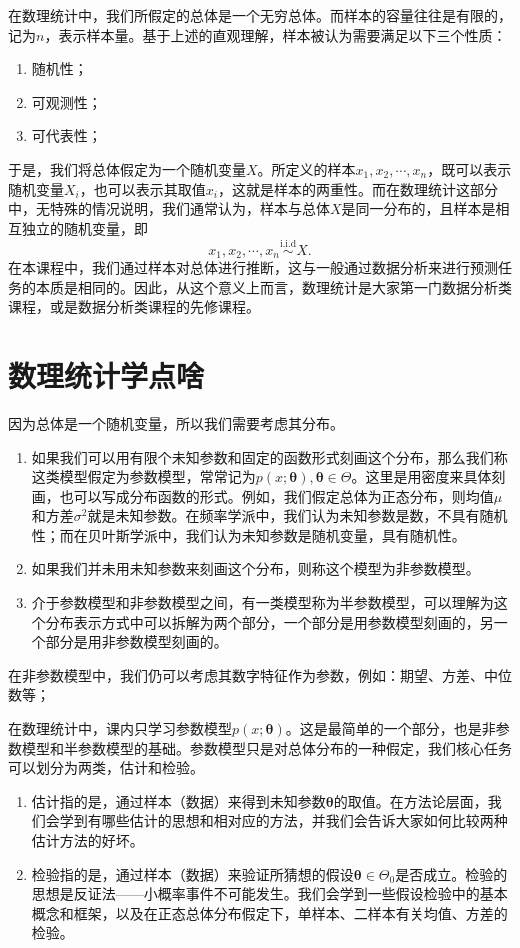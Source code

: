 在数理统计中，我们所假定的总体是一个无穷总体。而样本的容量往往是有限的，记为$n$，表示样本量。基于上述的直观理解，样本被认为需要满足以下三个性质：
\begin{enumerate}
    \item 随机性；
    \item 可观测性；
    \item 可代表性；
\end{enumerate}
于是，我们将总体假定为一个随机变量$X$。所定义的样本$x_1,x_2,\cdots,x_n$，既可以表示随机变量$X_i$，也可以表示其取值$x_i$，这就是样本的两重性。而在数理统计这部分中，无特殊的情况说明，我们通常认为，样本与总体$X$是同一分布的，且样本是相互独立的随机变量，即
$$
x_1,x_2,\cdots,x_n\overset{\text{i.i.d}}{\sim} X.
$$
在本课程中，我们通过样本对总体进行推断，这与一般通过数据分析来进行预测任务的本质是相同的。因此，从这个意义上而言，数理统计是大家第一门数据分析类课程，或是数据分析类课程的先修课程。

\section{数理统计学点啥}
因为总体是一个随机变量，所以我们需要考虑其分布。
\begin{enumerate}
    \item 如果我们可以用有限个未知参数和固定的函数形式刻画这个分布，那么我们称这类模型假定为参数模型，常常记为$p(x;\bm{\theta}),\bm{\theta}\in \Theta$。这里是用密度来具体刻画，也可以写成分布函数的形式。例如，我们假定总体为正态分布，则均值$\mu$和方差$\sigma^2$就是未知参数。在频率学派中，我们认为未知参数是数，不具有随机性；而在贝叶斯学派中，我们认为未知参数是随机变量，具有随机性。
    \item 如果我们并未用未知参数来刻画这个分布，则称这个模型为非参数模型。
    \item 介于参数模型和非参数模型之间，有一类模型称为半参数模型，可以理解为这个分布表示方式中可以拆解为两个部分，一个部分是用参数模型刻画的，另一个部分是用非参数模型刻画的。
\end{enumerate}
\begin{remark}
    在非参数模型中，我们仍可以考虑其数字特征作为参数，例如：期望、方差、中位数等；
\end{remark}
在数理统计中，课内只学习参数模型$p(x;\bm{\theta})$。这是最简单的一个部分，也是非参数模型和半参数模型的基础。参数模型只是对总体分布的一种假定，我们核心任务可以划分为两类，估计和检验。
\begin{enumerate}
    \item 估计指的是，通过样本（数据）来得到未知参数$\bm{\theta}$的取值。在方法论层面，我们会学到有哪些估计的思想和相对应的方法，并我们会告诉大家如何比较两种估计方法的好坏。
    \item 检验指的是，通过样本（数据）来验证所猜想的假设$\bm{\theta}\in \Theta_0$是否成立。检验的思想是反证法——小概率事件不可能发生。我们会学到一些假设检验中的基本概念和框架，以及在正态总体分布假定下，单样本、二样本有关均值、方差的检验。
\end{enumerate}
